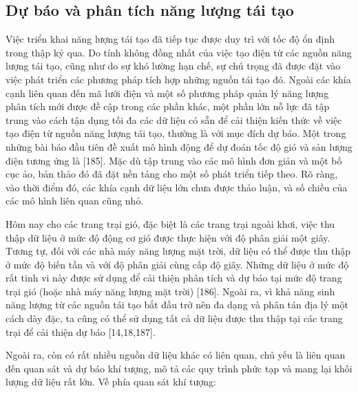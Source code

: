 \documentclass[utf8]{frontiersSCNS} %
\begin{document}
\subsection{Dự báo và phân tích năng lượng tái tạo}
Việc triển khai năng lượng tái tạo đã tiếp tục được duy trì với tốc độ ổn định trong thập kỷ qua. Do tính không đồng nhất của việc tạo điện từ các nguồn năng lượng tái tạo, cũng như do sự khó lường hạn chế, sự chú trọng đã được đặt vào việc phát triển các phương pháp tích hợp những nguồn tái tạo đó. Ngoài các khía cạnh liên quan đến mã lưới điện và một số phương pháp quản lý năng lượng phân tích mới được đề cập trong các phần khác, một phần lớn nỗ lực đã tập trung vào cách tận dụng tối đa các dữ liệu có sẵn để cải thiện kiến thức về việc tạo điện từ nguồn năng lượng tái tạo, thường là với mục đích dự báo. Một trong những bài báo đầu tiên đề xuất mô hình động để dự đoán tốc độ gió và sản lượng điện tương ứng là [185]. Mặc dù tập trung vào các mô hình đơn giản và một bố cục ảo, bản thảo đó đã đặt nền tảng cho một số phát triển tiếp theo. Rõ ràng, vào thời điểm đó, các khía cạnh dữ liệu lớn chưa được thảo luận, và số chiều của các mô hình liên quan cũng nhỏ.

Hôm nay cho các trang trại gió, đặc biệt là các trang trại ngoài khơi, việc thu thập dữ liệu ở mức độ động cơ gió được thực hiện với độ phân giải một giây. Tương tự, đối với các nhà máy năng lượng mặt trời, dữ liệu có thể được thu thập ở mức độ biến tần và với độ phân giải cùng cấp độ giây. Những dữ liệu ở mức độ rất tinh vi này được sử dụng để cải thiện phân tích và dự báo tại mức độ trang trại gió (hoặc nhà máy năng lượng mặt trời) [186]. Ngoài ra, vì khả năng sinh năng lượng từ các nguồn tái tạo bắt đầu trở nên đa dạng và phân tán địa lý một cách dày đặc, ta cũng có thể sử dụng tất cả dữ liệu được thu thập tại các trang trại để cải thiện dự báo [14,18,187].

Ngoài ra, còn có rất nhiều nguồn dữ liệu khác có liên quan, chủ yếu là liên quan đến quan sát và dự báo khí tượng, mô tả các quy trình phức tạp và mang lại khối lượng dữ liệu rất lớn. Về phía quan sát khí tượng:
\end{document}
